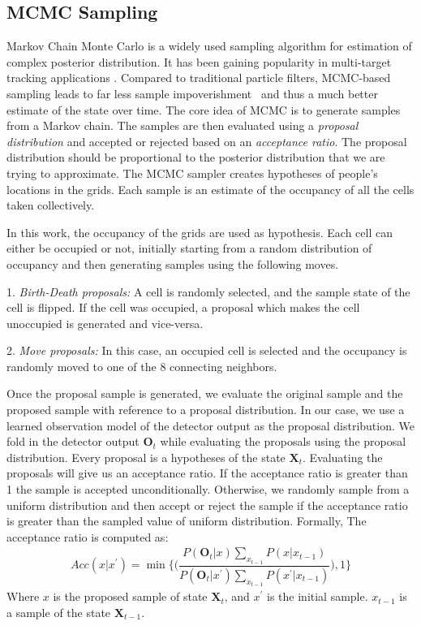 \subsection{MCMC Sampling}
\label{MCMC}
Markov Chain Monte Carlo is a widely used sampling algorithm for estimation of complex posterior distribution. It has been gaining popularity in multi-target tracking applications \cite{khan2004mcmc}. Compared to traditional particle filters, MCMC-based sampling leads to far less sample impoverishment%
~and thus a much better estimate of the state over time. The core idea of MCMC is to generate samples from a Markov chain. The samples are then evaluated using a \textit{proposal distribution} and accepted or rejected based on an \textit{acceptance ratio}. The proposal distribution should be proportional to the posterior distribution that we are trying to approximate. The MCMC sampler creates hypotheses of people's locations in the grids. Each sample is an estimate of the occupancy of all the cells taken collectively. 

In this work, the occupancy of the grids are used as hypothesis. Each cell can either be occupied or not, initially starting from a random distribution of occupancy and then generating samples using the following moves.

1. \textit{Birth-Death proposals:}
A cell is randomly selected, and the sample state of the cell is flipped. If the cell was occupied, a proposal which makes the cell unoccupied is generated and vice-versa.

2. \textit{Move proposals:}
In this case, an occupied cell is selected and the occupancy is randomly moved to one of the 8 connecting neighbors.

Once the proposal sample is generated, we evaluate the original sample and the proposed sample with reference to a proposal distribution. In our case, we use a learned observation model of the detector output as the proposal distribution. We fold in the detector output $\textbf{O}_{t}$ while evaluating the proposals using the proposal distribution. Every proposal is a hypotheses of the state $\textbf{X}_{t}$.
Evaluating the proposals will give us an acceptance ratio. If the acceptance ratio is greater than 1 the sample is accepted unconditionally. 
Otherwise, we randomly sample from a uniform distribution and then accept or reject the sample if the acceptance ratio is greater than the sampled value of uniform distribution. Formally,
The acceptance ratio is computed as:
\begin{align}
Acc(x|x^{'}) = \min\Big\lbrace\Big(\dfrac{P(\textbf{O}_{t}|x)\sum\limits_{x_{t-1}} P(x|x_{t-1})}{P(\textbf{O}_{t}|x^{'})\sum\limits_{x_{t-1}} P(x^{'}|x_{t-1})}\Big),1\Big\rbrace
\end{align}
Where $x$ is the proposed sample of state $\textbf{X}_{t}$, and $x^{'}$ is the initial sample. $x_{t-1}$ is a sample of the state $\textbf{X}_{t-1}$.

